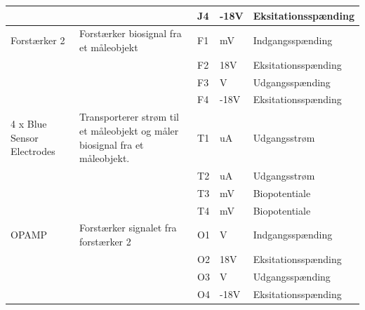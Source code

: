 \begin{table} [H]
\begin{tabular}  {|p{3cm}|p{4cm}|p{1cm}|p{1.5cm}|p{3.8cm}| }
	 &  & J4 & $  ${-18V}  & Eksitationsspænding 	 
	 
	   \\ \hline 
	 
	 
 Forstærker 2 & Forstærker biosignal fra et måleobjekt   &  F1 & mV & Indgangsspænding     \\ \cline{3-5}
	 &  & F2 & $  ${18V}  & Eksitationsspænding \\ \cline{3-5}
	 &  & F3 & V  & Udgangsspænding  \\ \cline{3-5}
	 &  & F4 & $  ${-18V}  & Eksitationsspænding
	 
	   \\ \hline
	 
	 
4 x Blue Sensor Electrodes & Transporterer strøm til et måleobjekt og måler biosignal fra et måleobjekt.  &  T1 & uA & Udgangsstrøm  \\ \cline{3-5}
	 &  & T2 & uA & Udgangsstrøm \\ \cline{3-5} 
	 &  & T3 & mV & Biopotentiale \\ \cline{3-5} 
	 &  & T4 & mV & Biopotentiale \\ \cline{3-5}  \hline
	 
	 
	  OPAMP & Forstærker signalet fra forstærker 2
	 &  O1 & V & Indgangsspænding     \\ \cline{3-5}
	 &  & O2 & $  ${18V}  & Eksitationsspænding \\ \cline{3-5}
	 &  & O3 & V  & Udgangsspænding  \\ \cline{3-5}
	 &  & O4 & $  ${-18V}  & Eksitationsspænding
	 
	   \\ \hline
	 
 \end{tabular}
 
\end{table}

\pagebreak

